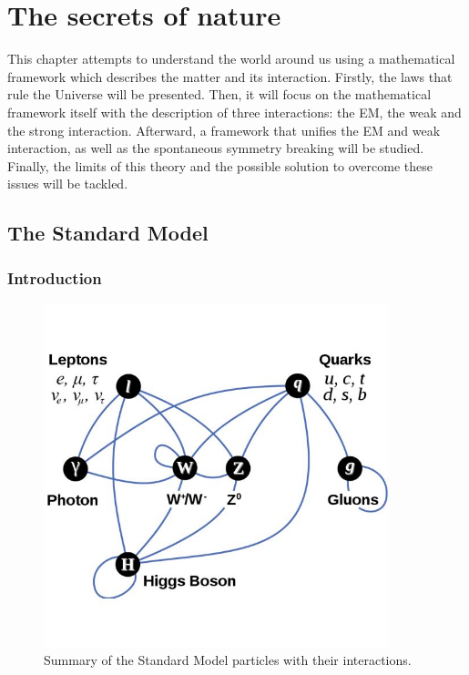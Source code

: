 \chapter{The secrets of nature}
\label{chap:SM}


  This chapter attempts to understand the world around us using a mathematical framework which describes the matter and its interaction.
  Firstly, the laws that rule the Universe will be presented.
  Then, it will focus on the mathematical framework itself with the description of three interactions: the \gls{EM}, the weak and the strong interaction.
  Afterward, a framework that unifies the \gls{EM} and weak interaction, as well as the spontaneous symmetry breaking will be studied.
  Finally, the limits of this theory and the possible solution to overcome these issues will be tackled.

  \minitoc
  \clearpage
  \section{The Standard Model}

    \subsection{Introduction}
     
    \begin{figure}[!h]
    \centering
      \includegraphics[width = 10cm]{Pictures/SM/elementaryParticles.jpg}
    \caption{Summary of the Standard Model particles with their interactions\cite{SM}.}
    \label{fig:partInterac}
    \end{figure}   
    
